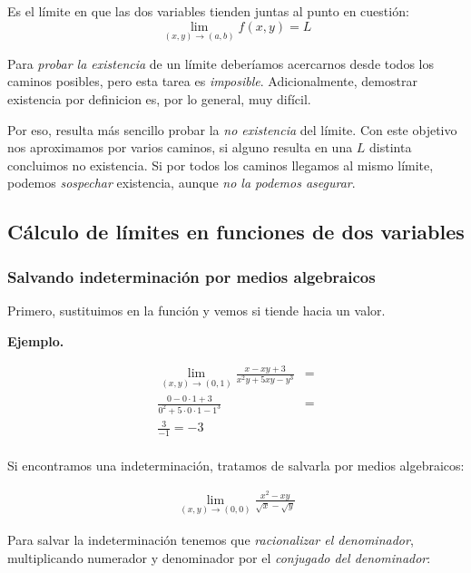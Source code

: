 Es el límite en que las dos variables tienden juntas al punto en cuestión:
\begin{equation*}
    \lim_{(x,y)\to(a,b)} f(x,y) = L
\end{equation*}

Para \textit{probar la existencia} de un límite deberíamos acercarnos desde
todos los caminos posibles,
pero esta tarea es \textit{imposible}.
Adicionalmente,
demostrar existencia por definicion es, por lo general, muy difícil.

Por eso,
resulta más sencillo probar la \textit{no existencia} del límite.
Con este objetivo nos aproximamos por varios caminos,
si alguno resulta en una \(L\) distinta concluimos no existencia.
Si por todos los caminos llegamos al mismo límite,
podemos \textit{sospechar} existencia,
aunque \textit{no la podemos asegurar}.


\subsection{Cálculo de límites en funciones de dos variables}

\subsubsection{Salvando indeterminación por medios algebraicos}

Primero, sustituimos en la función y vemos si tiende hacia un valor.

\textbf{Ejemplo.}

\begin{align*}
    \lim_{(x,y) \to (0,1)} \frac{x - xy + 3}{x^{2}y + 5xy - y^{3}} & = \\
    \frac{0 - 0\cdot1 + 3}{0^{2} + 5\cdot0\cdot1 - 1^{3}}          & = \\
    \frac{3}{-1} = \boxed{-3}                                          \\
\end{align*}

Si encontramos una indeterminación,
tratamos de salvarla por medios algebraicos:

\begin{align*}
    \lim_{(x,y) \to (0,0)}\frac{x^{2} - xy}{\sqrt{x}-\sqrt{y}}
\end{align*}

Para salvar la indeterminación tenemos que \textit{racionalizar el denominador},
multiplicando numerador y denominador por el \textit{conjugado del denominador}:

